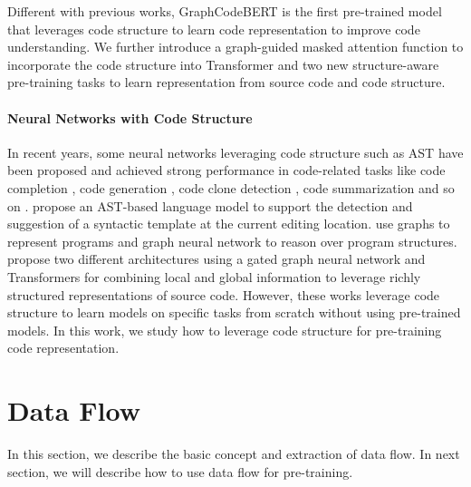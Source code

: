 \documentclass{article} \usepackage{iclr2021_conference,times}
\begin{document}
Different with previous works, GraphCodeBERT is the first pre-trained model that leverages code structure to learn code representation to improve code understanding. 
We further introduce a graph-guided masked attention function to incorporate the code structure into Transformer and two new structure-aware pre-training tasks to learn representation from source code and code structure. 


\paragraph{Neural Networks with Code Structure}
In recent years, some neural networks leveraging code structure such as AST have been proposed and achieved strong performance in code-related tasks like
code completion \citep{li2017code,alon2019structural,kim2020code}, code generation \citep{rabinovich2017abstract,yin17acl,brockschmidt2018generative}, code clone detection \citep{wei2017supervised,zhang2019novel,wang2020detecting}, code summarization \citep{alon2018code2seq,hu2018deep} and so on \citep{nguyen2015graph,allamanis2018learning,hellendoorn2019global}. \citet{nguyen2015graph} propose an AST-based language model to support the detection and suggestion of a syntactic template at the current editing location. \citet{allamanis2018learning} use graphs to represent programs and graph neural network to reason over program structures. \citet{hellendoorn2019global} propose two different architectures using a gated graph neural network and Transformers for combining local and global information to leverage richly structured representations of source code.
However, these works leverage code structure to learn models on specific tasks from scratch without using pre-trained models. In this work, we study how to leverage code structure for pre-training code representation. 
\section{Data Flow}
\label{data flow}

In this section, we describe the basic concept and extraction of data flow. In next section, we will describe how to use data flow for pre-training. 
\end{document}
